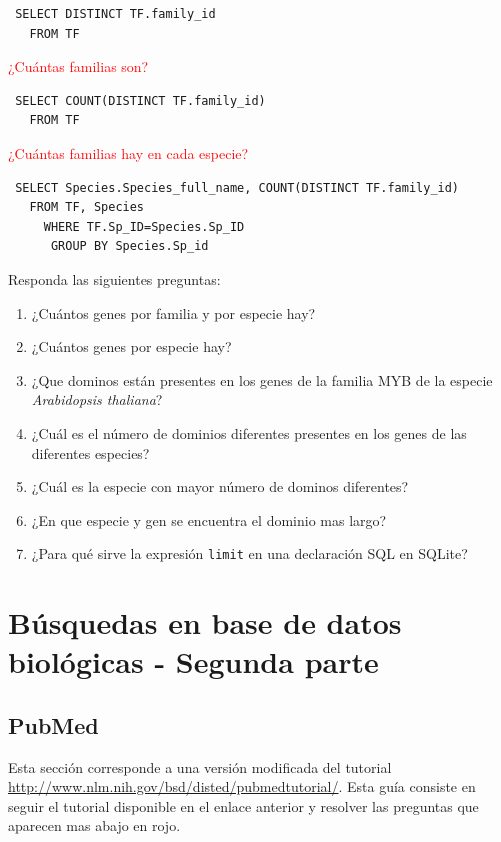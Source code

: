 \documentclass[letter,11pt]{book}
\begin{document}
\begin{Verbatim}
 SELECT DISTINCT TF.family_id
   FROM TF
\end{Verbatim}

\textcolor{red}{¿Cuántas familias son?}

\begin{Verbatim}
 SELECT COUNT(DISTINCT TF.family_id)
   FROM TF
\end{Verbatim}

\textcolor{red}{¿Cuántas familias hay en cada especie?}
\begin{Verbatim}
 SELECT Species.Species_full_name, COUNT(DISTINCT TF.family_id)
   FROM TF, Species
     WHERE TF.Sp_ID=Species.Sp_ID
      GROUP BY Species.Sp_id
\end{Verbatim}

{\color{red}
Responda las siguientes preguntas:

\begin{enumerate}
\item ¿Cuántos genes por familia y por especie hay?
\item ¿Cuántos genes por especie hay?
\item ¿Que dominos están presentes en los genes de la familia MYB de la especie \textit{Arabidopsis thaliana}?
\item ¿Cuál es el número de dominios diferentes presentes en los genes de las diferentes especies?
\item ¿Cuál es la especie con mayor número de dominos diferentes?
\item ¿En que especie y gen se encuentra el dominio mas largo?
\item ¿Para qué sirve la expresión \Verb+limit+ en una declaración SQL en SQLite?
\end{enumerate}
}

\chapter{Búsquedas en base de datos biológicas - Segunda parte}

\section{PubMed}

Esta sección corresponde a una versión modificada del tutorial \url{http://www.nlm.nih.gov/bsd/disted/pubmedtutorial/}. Esta guía consiste en seguir el tutorial disponible en el enlace anterior y resolver las preguntas que aparecen mas abajo en rojo.
\end{document}
